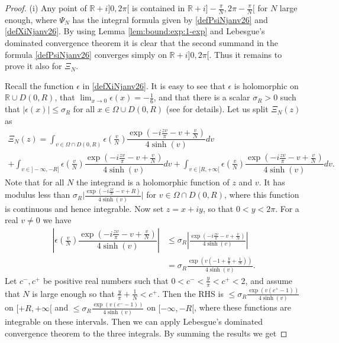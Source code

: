 \documentclass[11pt]{amsart}
\newcommand{\mr}{\mathbb{R}}
\begin{document}
{\begin{proof} (i) Any point of $\textstyle \mr +i]0, 2\pi[$ is contained in $\textstyle \mr +i]-\frac{\pi}{N}, 2\pi-\frac{\pi}{N}[$  for $N$ large enough, where $\Psi_N$ has the integral formula given by \eqref{defPsiNjanv26} and \eqref{defXiNjanv26}. By using Lemma \ref{lem:bound:exp:1-exp} and Lebesgue's dominated convergence theorem it is clear that the second summand in the formula \eqref{defPsiNjanv26} converges simply on $\textstyle \mr +i]0, 2\pi[$. Thus it remains to prove it also for $\Xi_N$. 

Recall the function $\epsilon$ in \eqref{defXiNjanv26}. It is easy to see that $\epsilon$ is holomorphic on $\mr\cup D(0,R)$, that $\textstyle \lim_{x\to 0}\epsilon(x) = -\frac{1}{6}$, and that there is a scalar $\sigma_R>0$ such that $\vert \epsilon(x)\vert \leq \sigma_R$ for all $x\in  \Omega \cup D(0,R)$ (see \cite[pp. 364-365]{BGP-N} for details). Let us split $\Xi_N(z)$ as
\begin{multline} \Xi_N(z) = \int_{v\in \Omega\cap D(0,R) } \epsilon\left (\frac{v}{N}\right ) \dfrac{\exp(-i\frac{z v}{\pi}-v+\frac{v}{N})}{4 \sinh(v)}dv \\ + \int_{v\in ]-\infty,-R]} \epsilon\left (\frac{v}{N}\right ) \dfrac{\exp(-i\frac{z v}{\pi}-v+\frac{v}{N})}{4 \sinh(v)}dv + \int_{v\in [R,+\infty[} \epsilon\left (\frac{v}{N}\right ) \dfrac{\exp(-i\frac{z v}{\pi}-v+\frac{v}{N})}{4 \sinh(v)}dv.
\end{multline}
Note that for all $N$ the integrand is a holomorphic function of $z$ and $v$. It has modulus less than $\sigma_R  \textstyle \vert \frac{\exp(-i\frac{z v}{\pi}-v+R)}{4 \sinh(v)} \vert$ for $v\in \Omega\cap D(0,R)$, where this function is continuous and hence integrable. Now set $z=x+iy$, so  that $0<y<2\pi$. For a real $v\ne 0$ we have 
\begin{align*}\left\vert \epsilon\left (\frac{v}{N}\right ) \dfrac{\exp(-i\frac{z v}{\pi}-v+\frac{v}{N})}{4 \sinh(v)} \right\vert & \leq \sigma_R  \left \vert \frac{\exp(-i\frac{z v}{\pi}-v+\frac{v}{N})}{4 \sinh(v)} \right\vert \\ & = \sigma_R  \frac{\exp(v(-1 + \frac{y}{\pi}+\frac{1}{N}))}{4 \sinh(v)}.
\end{align*}
Let $c^-, c^+$ be positive real numbers such that $\textstyle 0<c^-<\frac{y}{\pi}<c^+<2$, and assume that $N$ is large enough so that $\textstyle \frac{y}{\pi}+\frac{1}{N}<c^+$.  Then the RHS is $\leq \textstyle \sigma_R  \frac{\exp(v(c^+ -1))}{4 \sinh(v)}$ on $[+R,+\infty[$ and $\leq \textstyle \sigma_R  \frac{\exp(v(c^- -1))}{4 \sinh(v)}$ on $[-\infty,-R[$, where these functions are integrable on these intervals. Then we can apply Lebesgue's dominated convergence theorem to the three integrals. By summing the results we get

\end{proof}}
\end{document}
